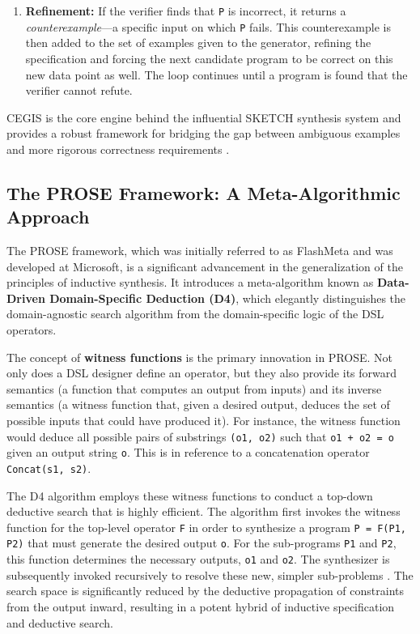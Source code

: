 \documentclass[12pt, a4paper]{report}
\begin{document}
\begin{itemize}
\begin{enumerate}
        \item \textbf{Refinement:} If the verifier finds that \texttt{P} is incorrect, it returns a \textit{counterexample}—a specific input on which \texttt{P} fails. This counterexample is then added to the set of examples given to the generator, refining the specification and forcing the next candidate program to be correct on this new data point as well. The loop continues until a program is found that the verifier cannot refute.
    \end{enumerate}
    CEGIS is the core engine behind the influential SKETCH synthesis system and provides a robust framework for bridging the gap between ambiguous examples and more rigorous correctness requirements \citep{solar2008sketch}.
\end{itemize}

\subsection{The PROSE Framework: A Meta-Algorithmic Approach}

\citep{polozov2015flashmeta} The PROSE framework, which was initially referred to as FlashMeta and was developed at Microsoft, is a significant advancement in the generalization of the principles of inductive synthesis.  It introduces a meta-algorithm known as \textbf{Data-Driven Domain-Specific Deduction (D4)}, which elegantly distinguishes the domain-agnostic search algorithm from the domain-specific logic of the DSL operators.

The concept of \textbf{witness functions} is the primary innovation in PROSE.  Not only does a DSL designer define an operator, but they also provide its forward semantics (a function that computes an output from inputs) and its inverse semantics (a witness function that, given a desired output, deduces the set of possible inputs that could have produced it).  For instance, the witness function would deduce all possible pairs of substrings \texttt{(o1, o2)} such that \texttt{o1 + o2 = o} given an output string \texttt{o}. This is in reference to a concatenation operator \texttt{Concat(s1, s2)}.

The D4 algorithm employs these witness functions to conduct a top-down deductive search that is highly efficient.  The algorithm first invokes the witness function for the top-level operator \texttt{F} in order to synthesize a program \texttt{P = F(P1, P2)} that must generate the desired output \texttt{o}.  For the sub-programs \texttt{P1} and \texttt{P2}, this function determines the necessary outputs, \texttt{o1} and \texttt{o2}.  The synthesizer is subsequently invoked recursively to resolve these new, simpler sub-problems \citep{polozov2015flashmeta}.  The search space is significantly reduced by the deductive propagation of constraints from the output inward, resulting in a potent hybrid of inductive specification and deductive search.
\end{document}
